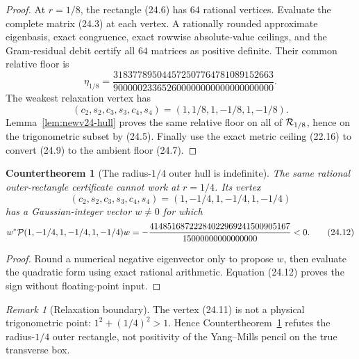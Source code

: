 \documentclass[11pt,oneside]{article}
\newtheorem{countertheorem}[theorem]{Countertheorem}
\theoremstyle{definition}
\theoremstyle{remark}
\newtheorem{remark}[theorem]{Remark}
\begin{document}
\begin{proof}
At \(r=1/8\), the rectangle (24.6) has \(64\) rational vertices.
Evaluate the complete matrix (24.3) at each vertex.  A rationally
rounded approximate eigenbasis, exact congruence, exact rowwise
absolute-value ceilings, and the Gram-residual debit certify all
\(64\) matrices as positive definite.  Their common relative floor
is
\[
 \eta_{1/8}=
 \frac{
318377895044572507764781089152663}
{900000233652600000000000000000000}.                    \tag{24.9}
\]
The weakest relaxation vertex has
\[
 (c_2,s_2,c_3,s_3,c_4,s_4)
 =(1,1/8,1,-1/8,1,-1/8).                                \tag{24.10}
\]
Lemma~\ref{lem:newv24-hull} proves the same relative floor on all of
\({\cal R}_{1/8}\), hence on the trigonometric subset by (24.5).
Finally use the exact metric ceiling (22.16) to convert (24.9) to
the ambient floor (24.7).
\end{proof}

\begin{countertheorem}[The radius-\(1/4\) outer hull is indefinite]
\label{ctr:newv24-quarter-relaxation}
The same rational outer-rectangle certificate cannot work at
\(r=1/4\).  Its vertex
\[
 (c_2,s_2,c_3,s_3,c_4,s_4)
 =(1,-1/4,1,-1/4,1,-1/4)                               \tag{24.11}
\]
has a Gaussian-integer vector \(w\ne0\) for which
\[
 w^*{\cal P}(1,-1/4,1,-1/4,1,-1/4)w
 =
 -\frac{41485168722284022969241500905167}
 {15000000000000000}<0.                                 \tag{24.12}
\]
\end{countertheorem}

\begin{proof}
Round a numerical negative eigenvector only to propose \(w\), then
evaluate the quadratic form using exact rational arithmetic.
Equation (24.12) proves the sign without floating-point input.
\end{proof}

\begin{remark}[Relaxation boundary]
\label{rem:newv24-relaxation}
The vertex (24.11) is not a physical trigonometric point:
\(1^2+(1/4)^2>1\).  Hence
Countertheorem~\ref{ctr:newv24-quarter-relaxation} refutes the
radius-\(1/4\) outer rectangle, not positivity of the Yang--Mills
pencil on the true transverse box.
\end{remark}
\end{document}
